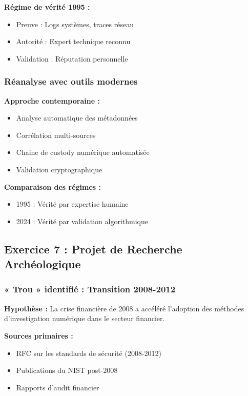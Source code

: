 \documentclass[12pt, a4paper]{article}
\begin{document}
\textbf{Régime de vérité 1995 :}
\begin{itemize}
\item Preuve : Logs systèmes, traces réseau
\item Autorité : Expert technique reconnu
\item Validation : Réputation personnelle
\end{itemize}

\subsubsection*{Réanalyse avec outils modernes}

\textbf{Approche contemporaine :}
\begin{itemize}
\item Analyse automatique des métadonnées
\item Corrélation multi-sources
\item Chaine de custody numérique automatisée
\item Validation cryptographique
\end{itemize}

\textbf{Comparaison des régimes :}
\begin{itemize}
\item 1995 : Vérité par expertise humaine
\item 2024 : Vérité par validation algorithmique
\end{itemize}

\subsection*{Exercice 7 : Projet de Recherche Archéologique}

\subsubsection*{« Trou » identifié : Transition 2008-2012}

\textbf{Hypothèse :} La crise financière de 2008 a accéléré l'adoption des méthodes d'investigation numérique dans le secteur financier.

\textbf{Sources primaires :}
\begin{itemize}
\item RFC sur les standards de sécurité (2008-2012)
\item Publications du NIST post-2008
\item Rapports d'audit financier
\end{itemize}
\end{document}
